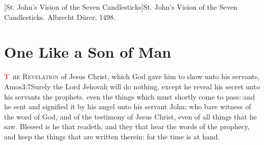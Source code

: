 [St. John's Vision of the Seven Candlesticks]{St. John's Vision of the Seven Candlesticks. Albrecht Dürer, 1498.}

\pagestyle{fancy}
\mainmatter
\trimFrame
\chapter{One Like a Son of Man}
\begingroup
\let\clearpage\relax
\endgroup
\lettrine[lines=3,nindent=-0.3em,loversize=0.05]{\textcolor{red}{T}}{\ he Revelation} of Jesus Christ, which God gave him to show unto his servants,%
			{Amos}{3:7}{Surely the Lord Jehovah will do nothing, except he reveal his secret unto his servants the prophets.}
 even the things which must shortly come to pass: and he sent and signified it by his angel unto his servant John; %
who bare witness of the word of God, and of the testimony of Jesus Christ, even of all things that he saw. %
Blessed is he that readeth, and they that hear the words of the prophecy, and keep the things that are written therein: for the time is at hand.
